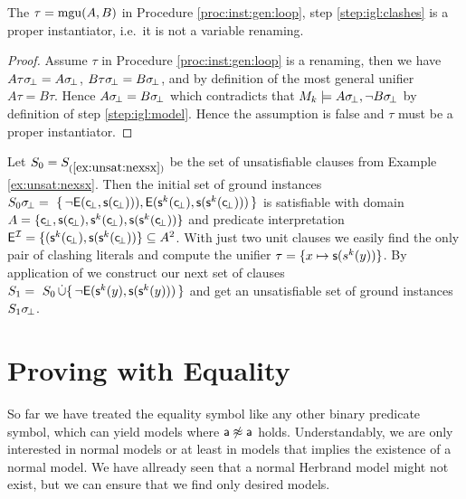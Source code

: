 \begin{lemma}
	The $\tau = \operatorname{mgu}(A,B)$ in Procedure \ref{proc:inst:gen:loop},
	step \ref{step:igl:clashes} is a proper instantiator,
	i.e.~it is not a variable renaming.
\end{lemma}
\begin{proof}
	Assume $\tau$ in Procedure \ref{proc:inst:gen:loop}
	is a renaming, then we have
	$A\tau\sigma\!_\bot = A\sigma\!_\bot$,
	$B\tau\sigma\!_\bot = B\sigma\!_\bot$,
	and by definition of the most general unifier $A\tau = B\tau$.
	Hence $A\sigma\!_\bot = B\sigma\!_\bot$ which contradicts that
	$M_k\models A\sigma\!_\bot, \lnot B\sigma\!_\bot$
	by definition of step \ref{step:igl:model}.
	Hence the assumption is false and $\tau$ must be a proper instantiator.
\end{proof}





\begin{example}\label{ex:unsat2}
Let $S_0 = S_{(\ref{ex:unsat:nexsx})}$ be the set of unsatisfiable clauses from Example \ref{ex:unsat:nexsx}.
Then the initial set of ground instances
$S_0\sigma\!_\bot =\
\{\,
{ \lnot\mathsf{E}(\mathsf{c}\!_\bot, \mathsf{s}(\mathsf{c}\!_\bot)))},
{ \mathsf{E}(\mathsf{s}^k(\mathsf{c}\!_\bot), \mathsf{s}(\mathsf{s}^k(\mathsf{c}\!_\bot)))}
\,\}$
is satisfiable with domain $A = \{ \mathsf{c}\!_\bot, \mathsf{s}(\mathsf{c}\!_\bot), \mathsf{s}^k(\mathsf{c}\!_\bot), \mathsf{s}(\mathsf{s}^k(\mathsf{c}\!_\bot)) \}$
and predicate interpretation
$\mathsf{E}^{\mathcal{I}} = \{ (\mathsf{s}^k(\mathsf{c}\!_\bot), \mathsf{s}(\mathsf{s}^k(\mathsf{c}\!_\bot))
 \} \subseteq A^2$.
%
 With just two unit clauses we easily find the only pair of clashing literals and compute the unifier
 $\tau = \{ x\mapsto \mathsf{s}(s^k(y)) \}$.
 By application of \InstGen we construct our next set of clauses
$
S_1 =\
S_0 \mathop{\dot\cup}
 \{\,
 { \lnot\mathsf{E}(\mathsf{s}^k(y), \mathsf{s}(\mathsf{s}^k(y)))}
 \,\}
 $
 and get an unsatisfiable set of ground instances $S_1\sigma\!_\bot$.
\end{example}




\section{Proving with Equality}\label{sec:proving:with:equality}

So far we have treated the equality symbol like any other binary predicate symbol,
which can yield models where $\mathsf{a}\not\approx\mathsf{a}$ holds.
Understandably, we are only interested in normal models or
at least in models that implies the existence of a normal model.
We have allready seen that a normal Herbrand model might not exist,
but we can ensure that we find only desired models.

